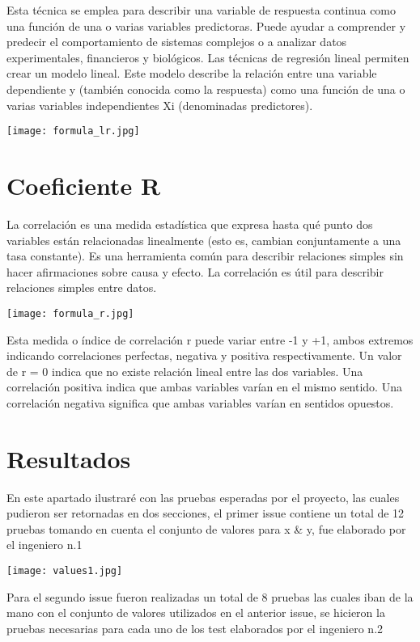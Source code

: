 \documentclass{report}
\begin{document}
  Esta técnica se emplea para describir una variable de respuesta continua como una función de una o varias variables predictoras. Puede ayudar a comprender y predecir el comportamiento de sistemas complejos o a analizar datos experimentales, financieros y biológicos. Las técnicas de regresión lineal permiten crear un modelo lineal. Este modelo describe la relación entre una variable dependiente  y  (también conocida como la respuesta) como una función de una o varias variables independientes  Xi  (denominadas predictores). 

 \texttt{[image: formula\_lr.jpg]}


 \newpage
 \section{Coeficiente R}
 La correlación es una medida estadística que expresa hasta qué punto dos variables están relacionadas linealmente (esto es, cambian conjuntamente a una tasa constante). Es una herramienta común para describir relaciones simples sin hacer afirmaciones sobre causa y efecto. La correlación es útil para describir relaciones simples entre datos. 
 
 \texttt{[image: formula\_r.jpg]}

 Esta medida o índice de correlación r puede variar entre -1 y +1, ambos extremos indicando correlaciones perfectas, negativa y positiva respectivamente. Un valor de r = 0 indica que no existe relación lineal entre las dos variables. Una correlación positiva indica que ambas variables varían en el mismo sentido. Una correlación negativa significa que ambas variables varían en sentidos opuestos. 

 \newpage
\section{Resultados}
 En este apartado ilustraré con las pruebas esperadas por el proyecto, las cuales pudieron ser retornadas en dos secciones, el primer issue contiene un total de 12 pruebas tomando en cuenta el conjunto de valores para x & y, fue elaborado por el ingeniero n.1  
 
  \texttt{[image: values1.jpg]}
  
Para el segundo issue fueron realizadas un total de 8 pruebas las cuales iban de la mano con el conjunto de valores utilizados en el anterior issue, se hicieron la pruebas necesarias para cada uno de los test elaborados por el ingeniero n.2
 
\end{document}
